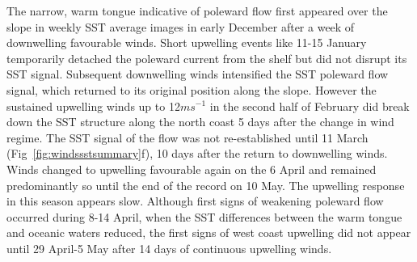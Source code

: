 The narrow, warm tongue indicative of poleward flow first appeared
over the slope in weekly SST average images in early December
after a week of downwelling favourable winds. Short upwelling
events like 11-15 January temporarily detached the poleward
current from the shelf but did not disrupt its SST signal.
Subsequent downwelling winds intensified the SST poleward flow
signal, which returned to its original position along the slope.
However the sustained upwelling winds up to 12$ms^{-1}$ in the
second half of February did break down the SST structure along the
north coast 5 days after the change in wind regime. The SST signal
of the flow was not re-established until 11 March
(Fig~\ref{fig:windssstsummary}f), 10 days after the return to
downwelling winds. Winds changed to upwelling favourable again on
the 6 April and remained predominantly so until the end of the
record on 10 May. The upwelling response in this season appears
slow. Although first signs of weakening poleward flow occurred
during 8-14 April, when the SST differences between the warm
tongue and oceanic waters reduced, the first signs of west coast
upwelling did not appear until 29 April-5 May after 14 days of
continuous upwelling winds.


